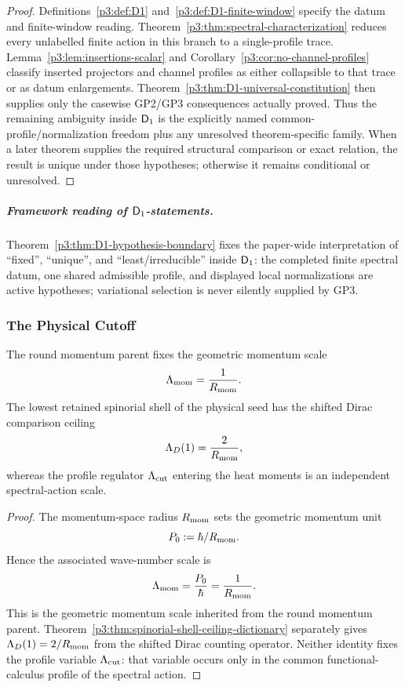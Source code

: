 \documentclass[12pt,a4paper]{article}
\begin{document}
\begin{proof}
Definitions~\ref{p3:def:D1} and~\ref{p3:def:D1-finite-window} specify the
datum and finite-window reading.  Theorem~\ref{p3:thm:spectral-characterization}
reduces every unlabelled finite action in this branch to a single-profile
trace.  Lemma~\ref{p3:lem:insertions-scalar} and
Corollary~\ref{p3:cor:no-channel-profiles} classify inserted projectors and
channel profiles as either collapsible to that trace or as datum enlargements.
Theorem~\ref{p3:thm:D1-universal-constitution} then supplies only the
casewise GP2/GP3 consequences actually proved.  Thus the remaining ambiguity
inside \(\mathsf{D}_1\) is the explicitly named common-profile/normalization freedom
plus any unresolved theorem-specific family.  When a later theorem supplies
the required structural comparison or exact relation, the result is unique
under those hypotheses; otherwise it remains conditional or unresolved.
\end{proof}

\subparagraph{Framework reading of \(\mathsf{D}_1\)-statements.}
Theorem~\ref{p3:thm:D1-hypothesis-boundary} fixes the paper-wide
interpretation of ``fixed'', ``unique'', and ``least/irreducible'' inside \(\mathsf{D}_1\):
the completed finite spectral datum, one shared admissible profile, and displayed
local normalizations are active hypotheses; variational selection is never
silently supplied by GP3.

\subsubsection{The Physical Cutoff}

\begin{proposition}
\label{p3:prop:cutoff_EH_normalized}
The round momentum parent fixes the geometric momentum scale
\begin{equation}
\Lambda_{\rm mom}=\frac{1}{R_{\mathrm{mom}}}.
\label{p3:eq:bare_cutoff_radius}
\end{equation}
The lowest retained spinorial shell of the physical seed has the shifted Dirac comparison ceiling
\begin{equation}
 \Lambda_D(1)=\frac{2}{R_{\mathrm{mom}}},
\end{equation}
whereas the profile regulator \(\Lambda_{\mathrm{cut}}\) entering the heat moments is an
independent spectral-action scale.
\end{proposition}

\begin{proof}
The momentum-space radius \(R_{\mathrm{mom}}\) sets the geometric momentum unit
\[
  P_{0}:=\hbar/R_{\mathrm{mom}} .
\]
Hence the associated wave-number scale is
\[
  \Lambda_{\rm mom}=\frac{P_{0}}{\hbar}=\frac{1}{R_{\mathrm{mom}}}.
\]
This is the geometric momentum scale inherited from the round momentum parent.
Theorem~\ref{p3:thm:spinorial-shell-ceiling-dictionary} separately gives
\(\Lambda_D(1)=2/R_{\mathrm{mom}}\) from the shifted Dirac counting operator.  Neither
identity fixes the profile variable \(\Lambda_{\mathrm{cut}}\): that variable occurs only in
the common functional-calculus profile of the spectral action.
\end{proof}
\end{document}
